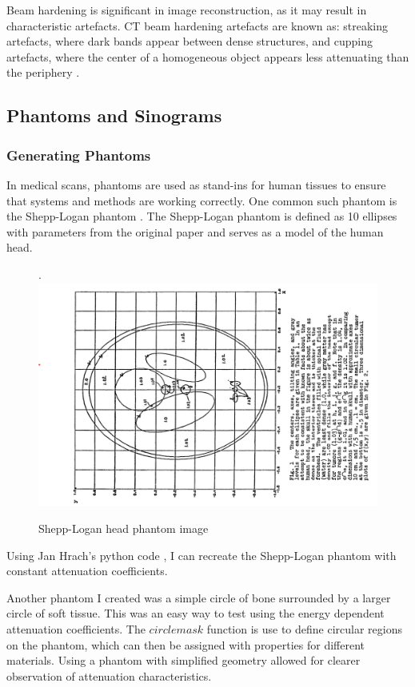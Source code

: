 \documentclass{article}
\theoremstyle{definition}
\begin{document}
Beam hardening is significant in image reconstruction, as it may result in characteristic artefacts. CT beam hardening artefacts are known as: streaking artefacts, where dark bands appear between dense structures, and cupping artefacts, where the center of a homogeneous object appears less attenuating than the periphery \cite{Murphy_2016}.

\subsection{Phantoms and Sinograms}
\subsubsection{Generating Phantoms}
In medical scans, phantoms are used as stand-ins for human tissues to ensure that systems and methods are working correctly. One common such phantom is the Shepp-Logan phantom \cite{Shepp_Logan_1974}. The Shepp-Logan phantom is defined as 10 ellipses with parameters from the original paper \cite{Shepp_Logan_1974} and serves as a model of the human head.

\begin{figure}.
	\includegraphics[width=\linewidth]{shepplogan.png}
	\caption{Shepp-Logan head phantom image}
	\label{fig:shepplogan}
\end{figure}

Using Jan Hrach's python code \cite{phantom_py}, I can recreate the Shepp-Logan phantom with constant attenuation coefficients.

Another phantom I created was a simple circle of bone surrounded by a larger circle of soft tissue. This was an easy way to test using the energy dependent attenuation coefficients. The $circlemask$ function is use to define circular regions on the phantom, which can then be assigned with properties for different materials. Using a phantom with simplified geometry allowed for clearer observation of attenuation characteristics.
\end{document}
